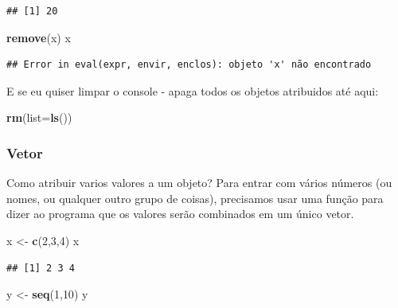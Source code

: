 \documentclass[
]{book}
\newenvironment{Shaded}{\begin{snugshade}}{\end{snugshade}}
\newcommand{\DataTypeTok}[1]{\textcolor[rgb]{0.13,0.29,0.53}{#1}}
\newcommand{\DecValTok}[1]{\textcolor[rgb]{0.00,0.00,0.81}{#1}}
\newcommand{\KeywordTok}[1]{\textcolor[rgb]{0.13,0.29,0.53}{\textbf{#1}}}
\newcommand{\NormalTok}[1]{#1}
\newcommand{\StringTok}[1]{\textcolor[rgb]{0.31,0.60,0.02}{#1}}
\begin{document}
\begin{verbatim}
## [1] 20
\end{verbatim}

\begin{Shaded}
\begin{Highlighting}[]
\KeywordTok{remove}\NormalTok{(x)}
\NormalTok{x}
\end{Highlighting}
\end{Shaded}

\begin{verbatim}
## Error in eval(expr, envir, enclos): objeto 'x' não encontrado
\end{verbatim}

E se eu quiser limpar o console - apaga todos os objetos atribuidos até aqui:

\begin{Shaded}
\begin{Highlighting}[]
\KeywordTok{rm}\NormalTok{(}\DataTypeTok{list=}\KeywordTok{ls}\NormalTok{())}
\end{Highlighting}
\end{Shaded}

\hypertarget{vetor}{%
\subsubsection{Vetor}\label{vetor}}

Como atribuir varios valores a um objeto? Para entrar com vários números (ou nomes, ou qualquer outro grupo de coisas), precisamos usar uma função para dizer ao programa que os valores serão combinados em um único vetor.

\begin{Shaded}
\begin{Highlighting}[]
\NormalTok{x <-}\StringTok{ }\KeywordTok{c}\NormalTok{(}\DecValTok{2}\NormalTok{,}\DecValTok{3}\NormalTok{,}\DecValTok{4}\NormalTok{)}
\NormalTok{x}
\end{Highlighting}
\end{Shaded}

\begin{verbatim}
## [1] 2 3 4
\end{verbatim}

\begin{Shaded}
\begin{Highlighting}[]
\NormalTok{y <-}\StringTok{ }\KeywordTok{seq}\NormalTok{(}\DecValTok{1}\NormalTok{,}\DecValTok{10}\NormalTok{)}
\NormalTok{y}
\end{Highlighting}
\end{Shaded}
\end{document}
